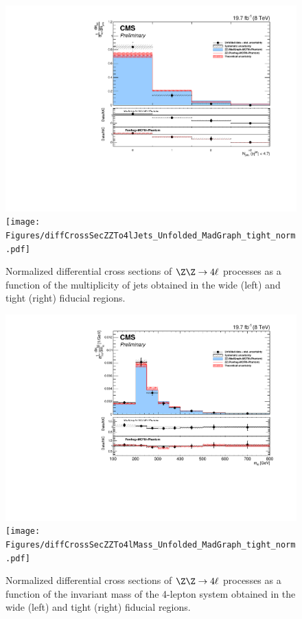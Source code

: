 \begin{figure}[hbtp]
  \begin{center}
    \includegraphics[width=1.2\cmsFigWidth]{Figures/diffCrossSecZZTo4lJets_Unfolded_MadGraph_norm.pdf}     
    \texttt{[image: Figures/diffCrossSecZZTo4lJets\_Unfolded\_MadGraph\_tight\_norm.pdf]}     
   \caption{\footnotesize{Normalized differential cross sections of $\Z\Z\to 4\ell$ processes as a function of the multiplicity of jets obtained in the wide (left) and tight (right) fiducial regions.}}
   \label{fig:xs_jets}
  \end{center}
\end{figure}
\begin{figure}[hbtp]
  \begin{center}
    \includegraphics[width=1.2\cmsFigWidth]{Figures/diffCrossSecZZTo4lMass_Unfolded_MadGraph_norm.pdf}     
    \texttt{[image: Figures/diffCrossSecZZTo4lMass\_Unfolded\_MadGraph\_tight\_norm.pdf]}     
   \caption{\footnotesize{Normalized differential cross sections of $\Z\Z\to 4\ell$ processes as a function of the invariant mass of the 4-lepton system obtained in the wide (left) and tight (right) fiducial regions.}}
   \label{fig:xs_mass}
  \end{center}
\end{figure}
